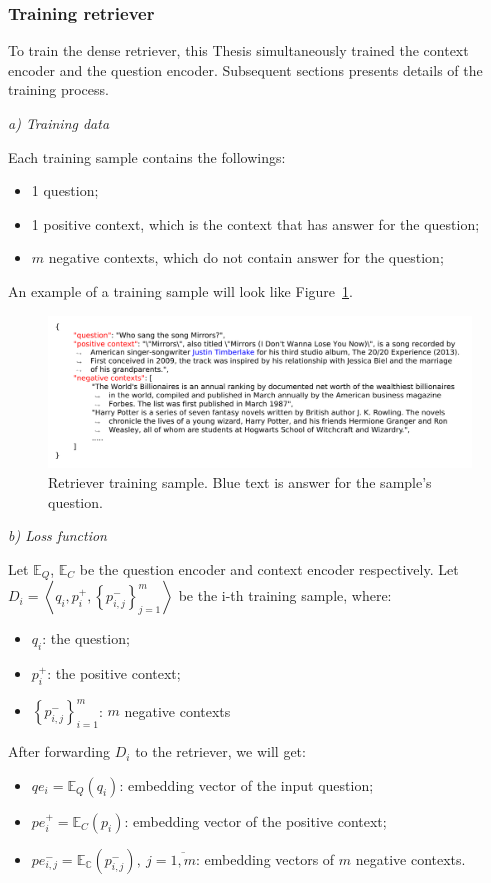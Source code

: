 \documentclass[12pt, sort&compress]{report}
\begin{document}
\subsubsection{Training retriever}
To train the dense retriever, this Thesis simultaneously trained the context encoder and the question encoder. Subsequent sections presents details of the training process.
\par \textit{a) Training data}
\par Each training sample contains the followings:
\begin{itemize}
	\item 1 question;
	\item 1 positive context, which is the context that has answer for the question;
	\item $m$ negative contexts, which do not contain answer for the question;
\end{itemize}
An example of a training sample will look like Figure~\ref{fig:05}.
\begin{figure}[!htbp]
	\centering
	\includegraphics[scale=.8]{images/PDF/retriever_sample/retriever_sample.pdf}
	\caption{Retriever training sample. Blue text is answer for the sample's question.}
	\label{fig:05}
\end{figure}
\par \textit{b) Loss function}
\par Let $\mathbb{E}_Q$, $\mathbb{E}_C$ be the question encoder and context encoder respectively. Let $D_i = \left\langle q_i, p_i^+, \left\{p^-_{i,j}\right\}_{j=1}^m\right\rangle$ be the i-th training sample, where:
\begin{itemize}
	\item $q_i$: the question;
	\item $p_i^+$: the positive context;
	\item $\left\{p_{i, j}^-\right\}_{i=1}^m$: $m$ negative contexts
\end{itemize}
\par After forwarding $D_i$ to the retriever, we will get:
\begin{itemize}[itemsep=5pt]
	\item $qe_i = \mathbb{E}_Q(q_i)$: embedding vector of the input question;
	\item $pe_i^+ = \mathbb{E}_C(p_i)$: embedding vector of the positive context;
	\item $pe_{i,j}^- = \mathbb{E_C}(p_{i,j}^-), \: j = \overline{1, m}$: embedding vectors of $m$ negative contexts.
\end{itemize}
\end{document}

